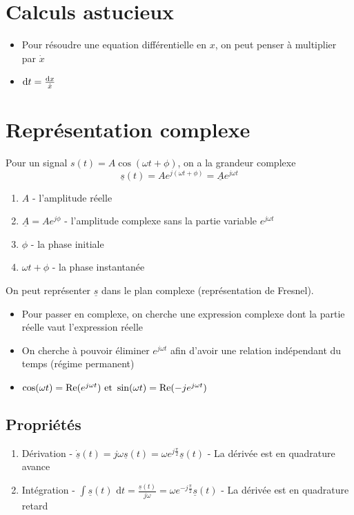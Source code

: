 \documentclass[openany]{book}
\begin{document}
\section{Calculs astucieux}

\begin{itemize}
    \item Pour résoudre une equation différentielle en $x$, on peut penser à multiplier par $\dot{x}$
    \item $\text{d}t = \frac{\text{d}x}{\dot{x}}$
\end{itemize}

\section{Représentation complexe}
Pour un signal $s(t) = A\cos{(\omega t + \phi)}$, on a la grandeur complexe 
\[\underline{s}(t) = Ae^{j(\omega t + \phi)} = \underline{A}e^{j\omega t}\]
\begin{enumerate}
    \item $A$ - l'amplitude réelle
    \item $\underline{A} = Ae^{j\phi}$ - l'amplitude complexe sans la partie variable $e^{j\omega t}$
    \item $\phi$ - la phase initiale
    \item $\omega t + \phi$ - la phase instantanée
\end{enumerate}

\noindent On peut représenter $\underline{s}$ dans le plan complexe (représentation de Fresnel). 

\begin{itemize}
    \item Pour passer en complexe, on cherche une expression complexe dont la partie réelle vaut l'expression réelle
    \item On cherche à pouvoir éliminer $e^{j\omega t}$ afin d'avoir une relation indépendant du temps (régime permanent)
    \item $\cos(\omega t) = \text{Re}(e^{j \omega t}) \text{ et } \sin(\omega t) = \text{Re}(-je^{j \omega t})$
\end{itemize}

\subsection{Propriétés}
\begin{enumerate}
    \item Dérivation - $ \underline{\dot{s}}(t) = j\omega\underline{s}(t) = \omega e^{j\frac{\pi}{2}} \underline{s}(t) $ - La dérivée est en quadrature avance
    \item Intégration - $ \int \underline{s}(t) \text{ d}t = \frac{\underline{s}(t)}{j\omega} = \omega e^{-j\frac{\pi}{2}} \underline{s}(t) $ - La dérivée est en quadrature retard
\end{enumerate}
\end{document}
